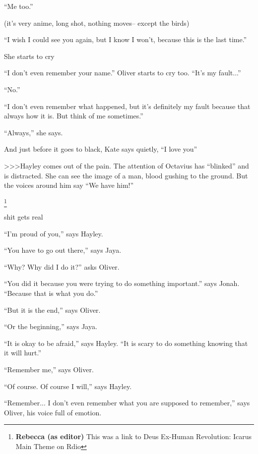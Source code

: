``Me too.''

(it's very anime, long shot, nothing moves-- except the birds)

``I wish I could see you again, but I know I won't, because this is the last time.''

She starts to cry

``I don't even remember your name.'' Oliver starts to cry too.  ``It's my fault...''

``No.''

``I don't even remember what happened, but it's definitely my fault because that always how it is.  But think of me sometimes.''

``Always,'' she says.



And just before it goes to black, Kate says quietly, ``I love you''



\textgreater \textgreater \textgreater  Hayley comes out of the pain.  The attention of Octavius has ``blinked'' and is distracted.  She can see the image of a man, blood gushing to the ground.  But the voices around him say ``We have him!''



 \footnote{\textbf{Rebecca (as editor) }This was a link to Deus Ex-Human Revolution: Icarus Main Theme on Rdio}

shit gets real



``I'm proud of you,'' says Hayley.



``You have to go out there,'' says Jaya.

``Why?  Why did I do it?'' asks Oliver.

``You did it because you were trying to do something important.'' says Jonah.  ``Because that is what you do.''

``But it is the end,'' says Oliver.

``Or the beginning,'' says Jaya.



``It is okay to be afraid,'' says Hayley.  ``It is scary to do something knowing that it will hurt.''



``Remember me,'' says Oliver.

``Of course.  Of course I will,'' says Hayley.

``Remember... I don't even remember what you are supposed to remember,'' says Oliver, his voice full of emotion.

